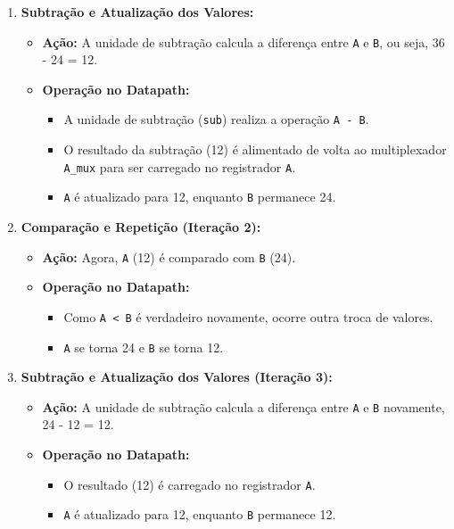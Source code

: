 \documentclass[a4paper,11pt]{article} %
\begin{document}
\begin{enumerate}
    \item \textbf{Subtração e Atualização dos Valores:}
    \begin{itemize}
        \item \textbf{Ação:} A unidade de subtração calcula a diferença entre \texttt{A} e \texttt{B}, ou seja, 36 - 24 = 12.
        \item \textbf{Operação no Datapath:} 
        \begin{itemize}
            \item A unidade de subtração (\texttt{sub}) realiza a operação \texttt{A - B}.
            \item O resultado da subtração (12) é alimentado de volta ao multiplexador \texttt{A\_mux} para ser carregado no registrador \texttt{A}.
            \item \texttt{A} é atualizado para 12, enquanto \texttt{B} permanece 24.
        \end{itemize}
    \end{itemize}

    \item \textbf{Comparação e Repetição (Iteração 2):}
    \begin{itemize}
        \item \textbf{Ação:} Agora, \texttt{A} (12) é comparado com \texttt{B} (24).
        \item \textbf{Operação no Datapath:} 
        \begin{itemize}
            \item Como \texttt{A < B} é verdadeiro novamente, ocorre outra troca de valores.
            \item \texttt{A} se torna 24 e \texttt{B} se torna 12.
        \end{itemize}
    \end{itemize}

    \item \textbf{Subtração e Atualização dos Valores (Iteração 3):}
    \begin{itemize}
        \item \textbf{Ação:} A unidade de subtração calcula a diferença entre \texttt{A} e \texttt{B} novamente, 24 - 12 = 12.
        \item \textbf{Operação no Datapath:} 
        \begin{itemize}
            \item O resultado (12) é carregado no registrador \texttt{A}.
            \item \texttt{A} é atualizado para 12, enquanto \texttt{B} permanece 12.
        \end{itemize}
    \end{itemize}


\end{enumerate}
\end{document}
